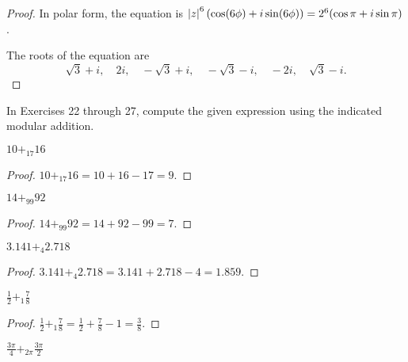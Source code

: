 \begin{proof}
    In polar form, the equation is $\left\vert{z}\right\vert^{6}(\cos(6\phi) + i\sin(6\phi)) = 2^{6}(\cos\pi + i\sin\pi)$.


    The roots of the equation are
    \[
        \sqrt{3} + i,\quad 2i,\quad -\sqrt{3} + i,\quad -\sqrt{3} - i,\quad -2i,\quad \sqrt{3} - i.
    \]
\end{proof}

In Exercises 22 through 27, compute the given expression using the indicated modular addition.

\newpage
\begin{exercise}
    $10 {+}_{17} 16$
\end{exercise}

\begin{proof}
    $10 {+}_{17} 16 = 10 + 16 - 17 = 9$.
\end{proof}

\newpage
\begin{exercise}
    $14 {+}_{99} 92$
\end{exercise}

\begin{proof}
    $14 {+}_{99} 92 = 14 + 92 - 99 = 7$.
\end{proof}

\newpage
\begin{exercise}
    $3.141 {+}_{4} 2.718$
\end{exercise}

\begin{proof}
    $3.141 {+}_{4} 2.718 = 3.141 + 2.718 - 4 = 1.859$.
\end{proof}

\newpage
\begin{exercise}
    $\frac{1}{2} {+}_{1} \frac{7}{8}$
\end{exercise}

\begin{proof}
    $\frac{1}{2} {+}_{1} \frac{7}{8} = \frac{1}{2} + \frac{7}{8} - 1 = \frac{3}{8}$.
\end{proof}

\newpage
\begin{exercise}
    $\frac{3\pi}{4} {+}_{2\pi} \frac{3\pi}{2}$
\end{exercise}

